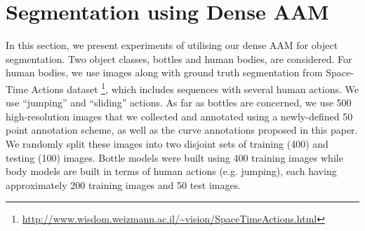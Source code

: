 \section{Segmentation using Dense AAM}
\label{sec:segmentation}

In this section, we present experiments of utilising our dense AAM for object segmentation. Two object classes, bottles and human bodies, are considered. For human bodies, we use images along with ground truth segmentation from Space-Time Actions dataset \footnote{\label{sta} \url{http://www.wisdom.weizmann.ac.il/~vision/SpaceTimeActions.html}}, which includes sequences with several human actions. We use ``jumping'' and ``sliding'' actions. As far as bottles are concerned, we use 500 high-resolution images that we collected and annotated using a newly-defined 50 point annotation scheme, as well as the curve annotations proposed in this paper. We randomly split these images into two disjoint sets of training (400) and testing (100) images. Bottle models were built using 400 training images while body models are built in terms of human actions (e.g. jumping), each having approximately 200 training images and 50 test images.

